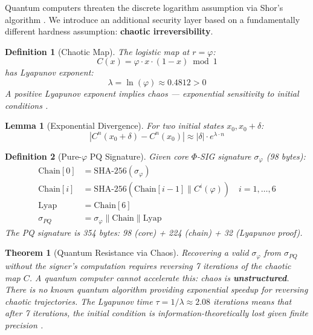 \documentclass{article}
\newtheorem{theorem}{Theorem}[section]
\newtheorem{definition}{Definition}[section]
\newtheorem{lemma}{Lemma}[section]
\begin{document}
Quantum computers threaten the discrete logarithm assumption via Shor's algorithm \cite{shor1997}. We introduce an additional security layer based on a fundamentally different hardness assumption: \textbf{chaotic irreversibility}.

\begin{definition}[Chaotic Map]
The logistic map at $r = \varphi$:
\begin{equation}
C(x) = \varphi \cdot x \cdot (1 - x) \bmod 1 \label{eq:chaotic}
\end{equation}
has Lyapunov exponent:
\begin{equation}
\lambda = \ln(\varphi) \approx 0.4812 > 0 \label{eq:lyapunov}
\end{equation}
A positive Lyapunov exponent implies chaos — exponential sensitivity to initial conditions \cite{strogatz2018}.
\end{definition}

\begin{lemma}[Exponential Divergence]
For two initial states $x_0, x_0 + \delta$:
\begin{equation}
|C^n(x_0 + \delta) - C^n(x_0)| \approx |\delta| \cdot e^{\lambda \cdot n} \label{eq:divergence}
\end{equation}
\end{lemma}

\begin{definition}[Pure-$\varphi$ PQ Signature]
Given core $\Phi$-SIG signature $\sigma_{\varphi}$ (98 bytes):
\begin{align}
\text{Chain}[0] &= \text{SHA-256}(\sigma_{\varphi}) \\
\text{Chain}[i] &= \text{SHA-256}(\text{Chain}[i-1] \parallel C^i(\varphi)) \quad i = 1,\ldots,6 \\
\text{Lyap} &= \text{Chain}[6] \\
\sigma_{PQ} &= \sigma_{\varphi} \parallel \text{Chain} \parallel \text{Lyap}
\end{align}
The PQ signature is 354 bytes: 98 (core) + 224 (chain) + 32 (Lyapunov proof).
\end{definition}

\begin{theorem}[Quantum Resistance via Chaos]
Recovering a valid $\sigma_{\varphi}$ from $\sigma_{PQ}$ without the signer's computation requires reversing 7 iterations of the chaotic map $C$. A quantum computer cannot accelerate this: chaos is \textbf{unstructured}. There is no known quantum algorithm providing exponential speedup for reversing chaotic trajectories. The Lyapunov time $\tau = 1/\lambda \approx 2.08$ iterations means that after 7 iterations, the initial condition is information-theoretically lost given finite precision \cite{strogatz2018}.
\end{theorem}
\end{document}
